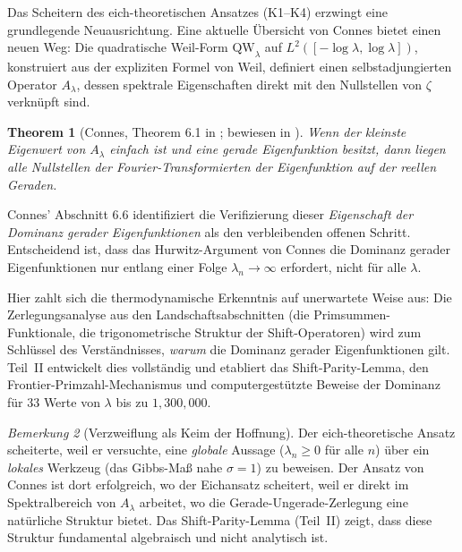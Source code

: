\documentclass[12pt,a4paper]{article}
\newtheorem{theorem}{Theorem}[section]
\theoremstyle{definition}
\theoremstyle{remark}
\newtheorem{remark}[theorem]{Bemerkung}
\begin{document}
Das Scheitern des eich-theoretischen Ansatzes (K1--K4) erzwingt eine grundlegende Neuausrichtung. Eine aktuelle Übersicht von Connes \cite{Connes2026} bietet einen neuen Weg: Die quadratische Weil-Form $\mathrm{QW}_\lambda$ auf $L^2([-\log\lambda, \log\lambda])$, konstruiert aus der expliziten Formel von Weil, definiert einen selbstadjungierten Operator $A_\lambda$, dessen spektrale Eigenschaften direkt mit den Nullstellen von $\zeta$ verknüpft sind.

\begin{theorem}[Connes, Theorem 6.1 in \cite{Connes2026}; bewiesen in \cite{ConnesvS2025}]
Wenn der kleinste Eigenwert von $A_\lambda$ einfach ist und eine gerade Eigenfunktion besitzt, dann liegen alle Nullstellen der Fourier-Transformierten der Eigenfunktion auf der reellen Geraden.
\end{theorem}

Connes' Abschnitt 6.6 identifiziert die Verifizierung dieser \emph{Eigenschaft der Dominanz gerader Eigenfunktionen} als den verbleibenden offenen Schritt. Entscheidend ist, dass das Hurwitz-Argument von Connes die Dominanz gerader Eigenfunktionen nur entlang einer Folge $\lambda_n \to \infty$ erfordert, nicht für alle $\lambda$.

Hier zahlt sich die thermodynamische Erkenntnis auf unerwartete Weise aus: Die Zerlegungsanalyse aus den Landschaftsabschnitten (die Primsummen-Funktionale, die trigonometrische Struktur der Shift-Operatoren) wird zum Schlüssel des Verständnisses, \emph{warum} die Dominanz gerader Eigenfunktionen gilt. Teil~II entwickelt dies vollständig und etabliert das Shift-Parity-Lemma, den Frontier-Primzahl-Mechanismus und computergestützte Beweise der Dominanz für 33 Werte von $\lambda$ bis zu $1{,}300{,}000$.

\begin{remark}[Verzweiflung als Keim der Hoffnung]
Der eich-theoretische Ansatz scheiterte, weil er versuchte, eine \emph{globale} Aussage ($\lambda_n \geq 0$ für alle $n$) über ein \emph{lokales} Werkzeug (das Gibbs-Maß nahe $\sigma = 1$) zu beweisen. Der Ansatz von Connes ist dort erfolgreich, wo der Eichansatz scheitert, weil er direkt im Spektralbereich von $A_\lambda$ arbeitet, wo die Gerade-Ungerade-Zerlegung eine natürliche Struktur bietet. Das Shift-Parity-Lemma (Teil~II) zeigt, dass diese Struktur fundamental algebraisch und nicht analytisch ist.
\end{remark}


\end{document}
